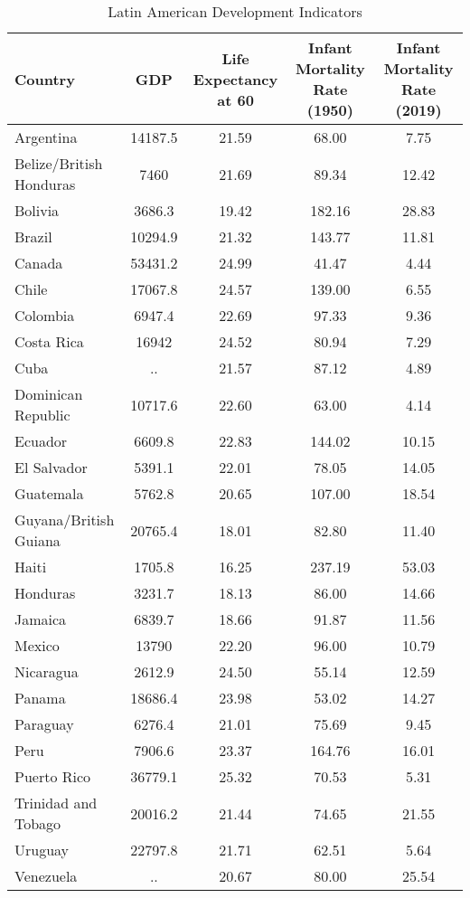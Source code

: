 \begin{table}[ht]
\centering
\caption{Latin American Development Indicators} 
\begin{tabular}{l|cccc}
  \hline
Country & GDP & Life Expectancy at 60 & Infant Mortality Rate (1950) & Infant Mortality Rate (2019) \\ 
  \hline
Argentina & 14187.5 & 21.59 & 68.00 & 7.75 \\ 
  Belize/British Honduras & 7460 & 21.69 & 89.34 & 12.42 \\ 
  Bolivia & 3686.3 & 19.42 & 182.16 & 28.83 \\ 
  Brazil & 10294.9 & 21.32 & 143.77 & 11.81 \\ 
  Canada & 53431.2 & 24.99 & 41.47 & 4.44 \\ 
  Chile & 17067.8 & 24.57 & 139.00 & 6.55 \\ 
  Colombia & 6947.4 & 22.69 & 97.33 & 9.36 \\ 
  Costa Rica & 16942 & 24.52 & 80.94 & 7.29 \\ 
  Cuba & .. & 21.57 & 87.12 & 4.89 \\ 
  Dominican Republic & 10717.6 & 22.60 & 63.00 & 4.14 \\ 
  Ecuador & 6609.8 & 22.83 & 144.02 & 10.15 \\ 
  El Salvador & 5391.1 & 22.01 & 78.05 & 14.05 \\ 
  Guatemala & 5762.8 & 20.65 & 107.00 & 18.54 \\ 
  Guyana/British Guiana & 20765.4 & 18.01 & 82.80 & 11.40 \\ 
  Haiti & 1705.8 & 16.25 & 237.19 & 53.03 \\ 
  Honduras & 3231.7 & 18.13 & 86.00 & 14.66 \\ 
  Jamaica & 6839.7 & 18.66 & 91.87 & 11.56 \\ 
  Mexico & 13790 & 22.20 & 96.00 & 10.79 \\ 
  Nicaragua & 2612.9 & 24.50 & 55.14 & 12.59 \\ 
  Panama & 18686.4 & 23.98 & 53.02 & 14.27 \\ 
  Paraguay & 6276.4 & 21.01 & 75.69 & 9.45 \\ 
  Peru & 7906.6 & 23.37 & 164.76 & 16.01 \\ 
  Puerto Rico & 36779.1 & 25.32 & 70.53 & 5.31 \\ 
  Trinidad and Tobago & 20016.2 & 21.44 & 74.65 & 21.55 \\ 
  Uruguay & 22797.8 & 21.71 & 62.51 & 5.64 \\ 
  Venezuela & .. & 20.67 & 80.00 & 25.54 \\ 
   \hline
\end{tabular}
\end{table}
